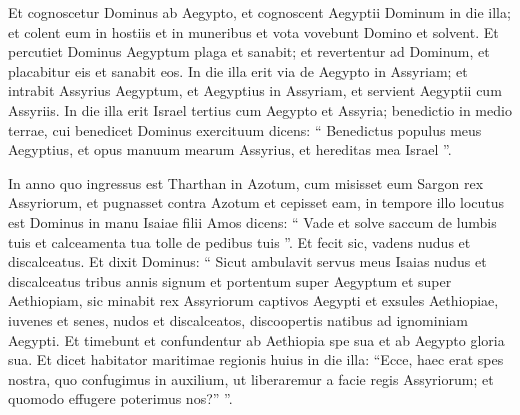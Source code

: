 \begin{biblechapter}
\begin{biblechapter}
\begin{biblechapter}
\begin{biblechapter}
\begin{biblechapter}
\begin{biblechapter}
\begin{biblechapter}
\begin{biblechapter}
\begin{biblechapter}
\begin{biblechapter}
\begin{biblechapter}
\begin{biblechapter}
\begin{biblechapter}
\begin{biblechapter}
\begin{biblechapter}
\begin{biblechapter}
\begin{biblechapter}
\begin{biblechapter}
\begin{biblechapter}
\verse Et cognoscetur Dominus ab Aegypto, et cognoscent Aegyptii Dominum in die illa; et colent eum in hostiis et in muneribus et vota vovebunt Domino et solvent. 
\verse Et percutiet Dominus Aegyptum plaga et sanabit; et revertentur ad Dominum, et placabitur eis et sanabit eos.
 \verse In die illa erit via de Aegypto in Assyriam; et intrabit Assyrius Aegyptum, et Aegyptius in Assyriam, et servient Aegyptii cum Assyriis.
 \verse In die illa erit Israel tertius cum Aegypto et Assyria; benedictio in medio terrae, 
\verse cui benedicet Dominus exercituum dicens: “ Benedictus populus meus Aegyptius, et opus manuum mearum Assyrius, et hereditas mea Israel ”.
 
\begin{biblechapter}
\verse In anno quo ingressus est Tharthan in Azotum, cum misisset eum Sargon rex Assyriorum, et pugnasset contra Azotum et cepisset eam, 
\verse in tempore illo locutus est Dominus in manu Isaiae filii Amos dicens: “ Vade et solve saccum de lumbis tuis et calceamenta tua tolle de pedibus tuis ”. Et fecit sic, vadens nudus et discalceatus. 
\verse Et dixit Dominus: “ Sicut ambulavit servus meus Isaias nudus et discalceatus tribus annis signum et portentum super Aegyptum et super Aethiopiam, 
\verse sic minabit rex Assyriorum captivos Aegypti et exsules Aethiopiae, iuvenes et senes, nudos et discalceatos, discoopertis natibus ad ignominiam Aegypti. 
\verse Et timebunt et confundentur ab Aethiopia spe sua et ab Aegypto gloria sua. 
\verse Et dicet habitator maritimae regionis huius in die illa: “Ecce, haec erat spes nostra, quo confugimus in auxilium, ut liberaremur a facie regis Assyriorum; et quomodo effugere poterimus nos?” ”.
 

\end{biblechapter}
\end{biblechapter}
\end{biblechapter}
\end{biblechapter}
\end{biblechapter}
\end{biblechapter}
\end{biblechapter}
\end{biblechapter}
\end{biblechapter}
\end{biblechapter}
\end{biblechapter}
\end{biblechapter}
\end{biblechapter}
\end{biblechapter}
\end{biblechapter}
\end{biblechapter}
\end{biblechapter}
\end{biblechapter}
\end{biblechapter}
\end{biblechapter}
